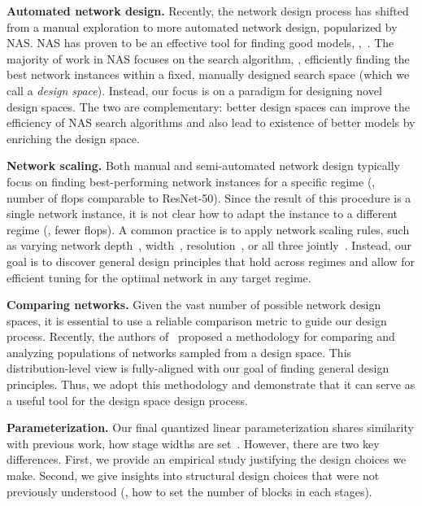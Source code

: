 \documentclass[10pt,twocolumn,letterpaper]{article}
\renewcommand{\paragraph}[1]{\vspace{1.5mm}\noindent\textbf{#1}}
\begin{document}
\paragraph{Automated network design.} Recently, the network design process has shifted from a manual exploration to more automated network design, popularized by NAS\@. NAS has proven to be an effective tool for finding good models, \eg,~\cite{Zoph2018, Real2018, Liu2018, Pham2018, Liu2019, Tan2019}. The majority of work in NAS focuses on the search algorithm, \ie, efficiently finding the best network instances within a fixed, manually designed search space (which we call a \emph{design space}). Instead, our focus is on a paradigm for designing novel design spaces. The two are complementary: better design spaces can improve the efficiency of NAS search algorithms and also lead to existence of better models by enriching the design space.

\paragraph{Network scaling.} Both manual and semi-automated network design typically focus on finding best-performing network instances for a specific regime (\eg, number of flops comparable to ResNet-50). Since the result of this procedure is a single network instance, it is not clear how to adapt the instance to a different regime (\eg, fewer flops). A common practice is to apply network scaling rules, such as varying network depth~\cite{He2016}, width~\cite{Zagoruyko2016}, resolution~\cite{Howard2017}, or all three jointly~\cite{Tan2019}. Instead, our goal is to discover general design principles that hold across regimes and allow for efficient tuning for the optimal network in any target regime.

\paragraph{Comparing networks.} Given the vast number of possible network design spaces, it is essential to use a reliable comparison metric to guide our design process. Recently, the authors of~\cite{Radosavovic2019} proposed a methodology for comparing and analyzing populations of networks sampled from a design space. This distribution-level view is fully-aligned with our goal of finding general design principles. Thus, we adopt this methodology and demonstrate that it can serve as a useful tool for the design space design process.

\paragraph{Parameterization.} Our final quantized linear parameterization shares similarity with previous work, \eg how stage widths are set~\cite{Simonyan2015, He2015b, Zagoruyko2016, Huang2017, Howard2017}. However, there are two key differences. First, we provide an empirical study justifying the design choices we make. Second, we give insights into structural design choices that were not previously understood (\eg, how to set the number of blocks in each stages).
\end{document}
